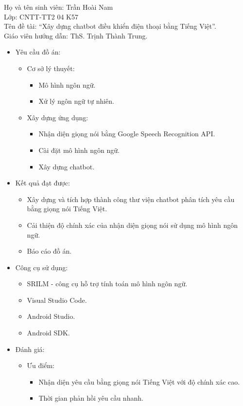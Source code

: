 \documentclass[12pt]{report}
\newcommand{\thesistitle}{Xây dựng chatbot điều khiển điện thoại bằng Tiếng Việt}
\begin{document}
\noindent Họ và tên sinh viên: Trần Hoài Nam \\
Lớp: CNTT-TT2 04 K57\\
Tên đề tài: ``\thesistitle{}''.\\
Giáo viên hướng dẫn: ThS. Trịnh Thành Trung.
\begin{itemize}
	\item Yêu cầu đồ án:
		\begin{itemize}
			\item Cơ sở lý thuyết:
			\begin{itemize}
				\item Mô hình ngôn ngữ.
				\item Xử lý ngôn ngữ tự nhiên.
			\end{itemize}
			\item Xây dựng ứng dụng:
			\begin{itemize}
				\item Nhận diện giọng nói bằng Google Speech Recognition API.
				\item Cài đặt mô hình ngôn ngữ.
				\item Xây dựng chatbot.
			\end{itemize}
		\end{itemize}
	\item Kết quả đạt được:
		\begin{itemize}
			\item Xây dựng và tích hợp thành công thư viện chatbot phân tích yêu cầu bằng giọng nói Tiếng Việt.
			\item Cải thiện độ chính xác của nhận diện giọng nói sử dụng mô hình ngôn ngữ.
			\item Báo cáo đồ án.
		\end{itemize}
	\item Công cụ sử dụng:
		\begin{itemize}
			\item SRILM - công cụ hỗ trợ tính toán mô hình ngôn ngữ.
			\item Visual Studio Code.
			\item Android Studio.
			\item Android SDK.
		\end{itemize}
	\item Đánh giá:
	\begin{itemize}
		\item Ưu điểm:
		\begin{itemize}
			\item Nhận diện yêu cầu bằng giọng nói Tiếng Việt với độ chính xác cao.
			\item Thời gian phản hồi yêu cầu nhanh.

\end{itemize}
\end{itemize}
\end{itemize}
\end{document}
